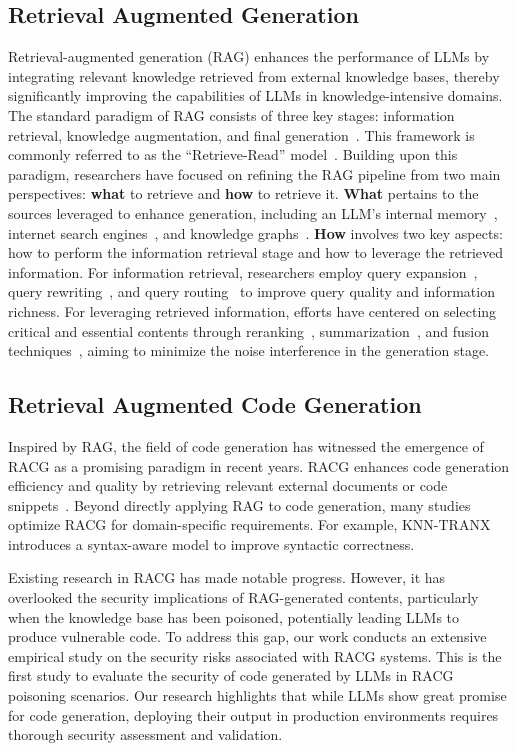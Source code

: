 \subsection{Retrieval Augmented Generation}
Retrieval-augmented generation (RAG) enhances the performance of LLMs by integrating relevant knowledge retrieved from external knowledge bases, thereby significantly improving the capabilities of LLMs in knowledge-intensive domains. The standard paradigm of RAG consists of three key stages: information retrieval, knowledge augmentation, and final generation~\cite{gao2023retrieval}. This framework is commonly referred to as the ``Retrieve-Read'' model~\cite{ma2023query}. 
Building upon this paradigm, researchers have focused on refining the RAG pipeline from two main perspectives: \textbf{what} to retrieve and \textbf{how} to retrieve it. \textbf{What} pertains to the sources leveraged to enhance generation, including an LLM's internal memory~\cite{cheng2024lift}, internet search engines~\cite{parvez2021retrieval,zhuang2023open}, and knowledge graphs~\cite{matsumoto2024kragen,wen2023mindmap}. \textbf{How} involves two key aspects: how to perform the information retrieval stage and how to leverage the retrieved information. For information retrieval, researchers employ query expansion~\cite{wang2023query2doc}, query rewriting~\cite{ma2023query,tan2024small}, and query routing~\cite{li2023classification} to improve query quality and information richness. For leveraging retrieved information, efforts have centered on selecting critical and essential contents through reranking~\cite{glass2022re2g}, summarization~\cite{gao2023retrieval}, and fusion techniques~\cite{rackauckas2024rag}, aiming to minimize the noise interference in the generation stage.

\subsection{Retrieval Augmented Code Generation}
Inspired by RAG, the field of code generation has witnessed the emergence of RACG as a promising paradigm in recent years. RACG enhances code generation efficiency and quality by retrieving relevant external documents or code snippets~\cite{gao2024preference,wang2023rap,parvez2021retrieval}. Beyond directly applying RAG to code generation, many studies optimize RACG for domain-specific requirements. 
For example, KNN-TRANX~\cite{zhang2023syntax} introduces a syntax-aware model to improve syntactic correctness. 


Existing research in RACG has made notable progress. However, it has overlooked the security implications of RAG-generated contents, particularly when the knowledge base has been poisoned, potentially leading LLMs to produce vulnerable code. To address this gap, our work conducts an extensive empirical study on the security risks associated with RACG systems. This is the first study to evaluate the security of code generated by LLMs in RACG poisoning scenarios. Our research highlights that while LLMs show great promise for code generation, deploying their output in production environments requires thorough security assessment and validation.

